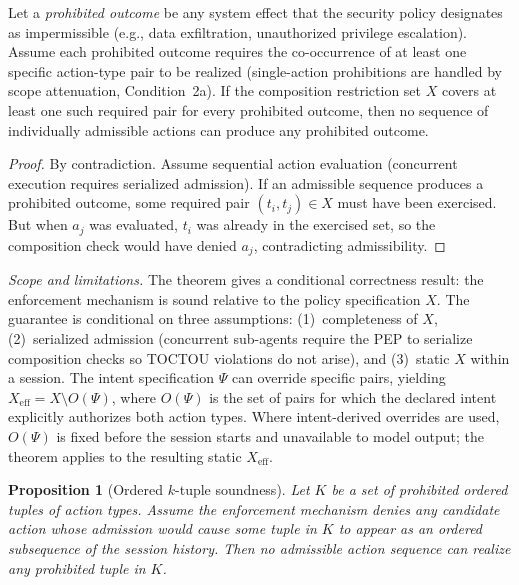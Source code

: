\documentclass[sigconf,nonacm]{acmart}
\newtheorem{proposition}{Proposition}[section]
\begin{document}
\begin{theorem}\label{thm:composition}
Let a \emph{prohibited outcome} be any system effect that the security policy designates as impermissible (e.g., data exfiltration, unauthorized privilege escalation). Assume each prohibited outcome requires the co-occurrence of at least one specific action-type pair to be realized (single-action prohibitions are handled by scope attenuation, Condition~2a). If the composition restriction set $X$ covers at least one such required pair for every prohibited outcome, then no sequence of individually admissible actions can produce any prohibited outcome.
\end{theorem}

\begin{proof}
By contradiction. Assume sequential action evaluation (concurrent execution requires serialized admission). If an admissible sequence produces a prohibited outcome, some required pair $(t_i, t_j) \in X$ must have been exercised. But when $a_j$ was evaluated, $t_i$ was already in the exercised set, so the composition check would have denied $a_j$, contradicting admissibility.\qedhere
\end{proof}

\emph{Scope and limitations.} The theorem gives a conditional correctness result: the enforcement mechanism is sound relative to the policy specification $X$. The guarantee is conditional on three assumptions: (1)~completeness of $X$, (2)~serialized admission (concurrent sub-agents require the PEP to serialize composition checks so TOCTOU violations do not arise), and (3)~static $X$ within a session. The intent specification $\Psi$ can override specific pairs, yielding $X_{\mathrm{eff}} = X \setminus O(\Psi)$, where $O(\Psi)$ is the set of pairs for which the declared intent explicitly authorizes both action types. Where intent-derived overrides are used, $O(\Psi)$ is fixed before the session starts and unavailable to model output; the theorem applies to the resulting static $X_{\mathrm{eff}}$.

\begin{proposition}[Ordered $k$-tuple soundness]\label{prop:ktuple}
Let $K$ be a set of prohibited ordered tuples of action types. Assume the enforcement mechanism denies any candidate action whose admission would cause some tuple in $K$ to appear as an ordered subsequence of the session history. Then no admissible action sequence can realize any prohibited tuple in $K$.
\end{proposition}
\end{document}
